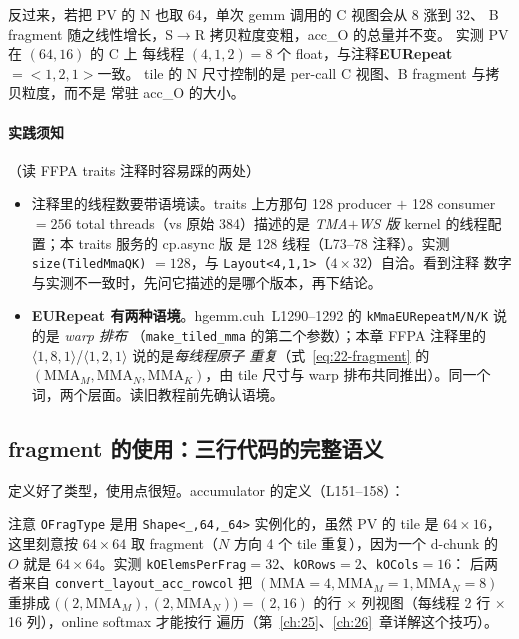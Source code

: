 反过来，若把 PV 的 N 也取 64，单次 gemm 调用的 C 视图会从 8 涨到 32、
B fragment 随之线性增长，S$\to$R 拷贝粒度变粗，acc\_O 的总量并不变。
实测 PV 在 $(64,16)$ 的 C 上
每线程 $(4,1,2) = 8$ 个 float，与注释\textbf{EURepeat$=<1,2,1>$}一致。
tile 的 N 尺寸控制的是 per-call C 视图、B fragment 与拷贝粒度，而不是
常驻 acc\_O 的大小。

\paragraph{实践须知}（读 FFPA traits 注释时容易踩的两处）
\begin{itemize}
  \item 注释里的线程数要带语境读。traits 上方那句 128 producer
        $+$ 128 consumer $= 256$ total threads（vs 原始 384）描述的是
        \emph{TMA$+$WS 版} kernel 的线程配置；本 traits 服务的 cp.async 版
        是 128 线程（L73--78 注释）。实测 \texttt{size\allowbreak{}(Tiled\allowbreak{}Mma\allowbreak{}QK)}
        $= 128$，与 \texttt{Layout\allowbreak{}<4,\allowbreak{}1,\allowbreak{}1>}（$4\times32$）自洽。看到注释
        数字与实测不一致时，先问它描述的是哪个版本，再下结论。
  \item \textbf{EURepeat 有两种语境}。hgemm.cuh~L1290--1292 的
        \texttt{k\allowbreak{}Mma\allowbreak{}EURepeat\allowbreak{}M/\allowbreak{}N/\allowbreak{}K} 说的是 \emph{warp 排布}
        （\texttt{make\_\allowbreak{}tiled\_\allowbreak{}mma} 的第二个参数）；本章 FFPA 注释里的
        $\langle1,8,1\rangle$/$\langle1,2,1\rangle$ 说的是\emph{每线程原子
        重复}（式~\eqref{eq:22-fragment} 的
        $(\mathrm{MMA}_M,\mathrm{MMA}_N,\mathrm{MMA}_K)$，由 tile 尺寸与
        warp 排布共同推出）。同一个词，两个层面。读旧教程前先确认语境。
\end{itemize}

\subsection{fragment 的使用：三行代码的完整语义}

定义好了类型，使用点很短。accumulator 的定义（L151--158）：



注意 \texttt{OFragType} 是用 \texttt{Shape\allowbreak{}<\_\allowbreak{},\allowbreak{}64,\allowbreak{}\_\allowbreak{}64>} 实例化的，虽然 PV
的 tile 是 $64\times16$，这里刻意按 $64\times64$ 取 fragment（$N$ 方向 4 个
tile 重复），因为一个 d-chunk 的 $O$ 就是 $64\times64$。实测
\texttt{k\allowbreak{}OElems\allowbreak{}Per\allowbreak{}Frag}$=32$、\texttt{kORows}$=2$、\texttt{kOCols}$=16$：
后两者来自 \texttt{convert\_\allowbreak{}layout\_\allowbreak{}acc\_\allowbreak{}rowcol} 把
$(\mathrm{MMA}=4,\mathrm{MMA}_M=1,\mathrm{MMA}_N=8)$ 重排成
$\bigl((2,\mathrm{MMA}_M),(2,\mathrm{MMA}_N)\bigr) = (2,16)$ 的行 $\times$
列视图（每线程 2 行 $\times$ 16 列），online softmax 才能按行
遍历（第~\ref{ch:25}、\ref{ch:26}~章详解这个技巧）。

